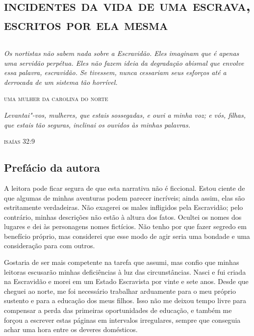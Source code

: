 \part*{\textsc{incidentes da vida de uma escrava, escritos por ela mesma}}

\chapter*{}

\thispagestyle{empty}
\vspace*{\fill}

\epigraph{\emph{Os nortistas não sabem nada sobre a
Escravidão. Eles imaginam que é apenas uma servidão perpétua. Eles não
fazem ideia da degradação abismal que envolve essa palavra,
escravidão. Se tivessem, nunca cessariam seus esforços até a derrocada
de um sistema tão horrível.}}{\textsc{uma mulher da carolina do norte}}

\epigraph{\emph{Levantai"-vos, mulheres, que estais
sossegadas, e ouvi a minha voz; e vós, filhas, que estais tão seguras,
inclinai os ouvidos às minhas palavras.}}{\textsc{isaías 32:9}}

\chapter*{Prefácio da autora}

A leitora pode ficar segura de que esta
narrativa não é ficcional. Estou ciente de que algumas de minhas
aventuras podem parecer incríveis; ainda assim, elas são estritamente
verdadeiras. Não exagerei os males infligidos pela Escravidão; pelo
contrário, minhas descrições não estão à altura dos fatos. Ocultei os
nomes dos lugares e dei às personagens nomes fictícios. Não tenho por
que fazer segredo em benefício próprio, mas considerei que esse modo de
agir seria uma bondade e uma consideração para com outros.

Gostaria de ser mais competente na
tarefa que assumi, mas confio que minhas leitoras escusarão minhas
deficiências à luz das circunstâncias. Nasci e fui criada na Escravidão
e morei em um Estado Escravista por vinte e sete anos. Desde que cheguei
ao norte, me foi necessário trabalhar arduamente para o meu próprio
sustento e para a educação dos meus filhos. Isso não me deixou tempo
livre para compensar a perda das primeiras oportunidades de educação, e
também me forçou a escrever estas páginas em intervalos irregulares,
sempre que conseguia achar uma hora entre os deveres domésticos.

